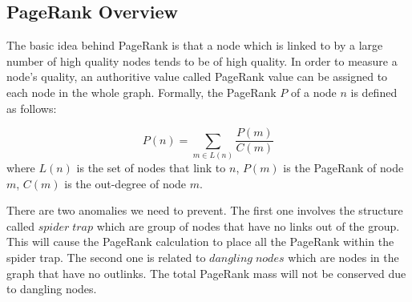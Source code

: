 \documentclass[12pt,conference,letterpaper]{IEEEtran}
\begin{document}
\subsection{PageRank Overview}
The basic idea behind PageRank is that a node which is linked to by a large number of high quality nodes tends to be of high quality. In order to measure a node's quality, an authoritive value called PageRank value can be assigned to each node in the whole graph. Formally, the PageRank $P$ of a node $n$ is defined as follows:



\begin{equation}
P(n) = \sum_{m \in L(n)} \frac{P(m)}{C(m)} \label{eq:pr_1}
\end{equation}
where $L(n)$ is the set of nodes that link to $n$, $P(m)$ is the PageRank of node $m$, $C(m)$ is the out-degree of node $m$.


There are two anomalies we need to prevent. The first one involves the structure called $spider\;trap$ which are group of nodes that have no links out of the group. This will cause the PageRank calculation to place all the PageRank within the spider trap. The second one is related to $dangling\;nodes$ which are nodes in the graph that have no outlinks. The total PageRank mass will not be conserved due to dangling nodes. 
\end{document}
